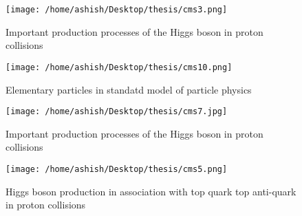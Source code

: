 \documentclass[final,3p]{CSP}
\begin{document}
\begin{figure}
  \centering
   \texttt{[image: /home/ashish/Desktop/thesis/cms3.png]}
  \caption{Important production processes of the Higgs boson in proton collisions}
   \label{figure 8}
\end{figure}


\begin{figure}
  \centering
   \texttt{[image: /home/ashish/Desktop/thesis/cms10.png]}
  \caption{Elementary particles in standatd model of particle physics}
   \label{figure 9}
\end{figure}

\begin{figure}
  \centering
   \texttt{[image: /home/ashish/Desktop/thesis/cms7.jpg]}
  \caption{Important production processes of the Higgs boson in proton collisions}
   \label{figure 10}
\end{figure}


\begin{figure}
  \centering
   \texttt{[image: /home/ashish/Desktop/thesis/cms5.png]}
  \caption{Higgs boson production in association with top quark top anti-quark in proton collisions}
   \label{figure 11}
\end{figure}
\end{document}
